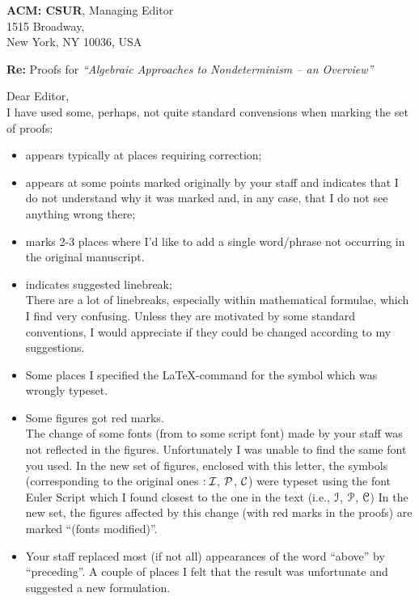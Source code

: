 \documentclass[11pt]{letter}
\begin{document}
\begin{letter}{ {\bf ACM: CSUR}, Managing Editor\\
  1515 Broadway,\\
 New York,  NY 10036, USA }
\address{Micha{\l} Walicki \\ University of Bergen, Dept. of Informatics\\
         HiB, 5020 Bergen, NORWAY \\
         {\small{{\em e-mail:} michal@ii.uib..no}} }


\opening{{\bf Re:} Proofs for 
{\em ``Algebraic Approaches to Nondeterminism -- an Overview''}}
Dear Editor,\\[1ex]
I have used some, perhaps, not quite standard convensions when marking the set of proofs:
\begin{itemize}
\item[{}] appears typically at places requiring correction;
\item[{}] appears at some points marked originally by your staff and indicates that 
 I do not understand why it was marked and, in any case, that I do not see anything wrong there;
\item[{}] marks 2-3 places where I'd like to add a single word/phrase not occurring in 
the original manuscript.
\item[{}] indicates suggested linebreak;\\
There are a lot of linebreaks, especially within mathematical formulae, which I find
very confusing. Unless they are motivated by some standard conventions, I would appreciate if
they could be changed according to my suggestions.
\item Some places I specified the \LaTeX-command for the symbol which was wrongly typeset.
\item Some figures got red marks. \\
The change of some fonts (from {} to some {\sf script} font) 
made by your staff was not reflected in the figures.
Unfortunately I was unable to find the same font you used. 
In the new set of figures, 
enclosed with this letter, the symbols (corresponding to the original 
ones $:{\cal I}$, ${\cal P}$, ${\cal C}$) were typeset using the font
 {\sf Euler Script} which I found closest to the one in the text (i.e., 
 $\EuScript{I}$,  $\EuScript{P}$, $\EuScript{C}$)
In the new set, the figures affected by this change (with red marks in the proofs) are marked 
``(fonts modified)''.
\item
Your staff replaced most (if not all) appearances of the word ``above'' by ``preceding''. 
A couple of places I felt that the result was unfortunate and suggested a new formulation.
\end{itemize}


\end{letter}
\end{document}
